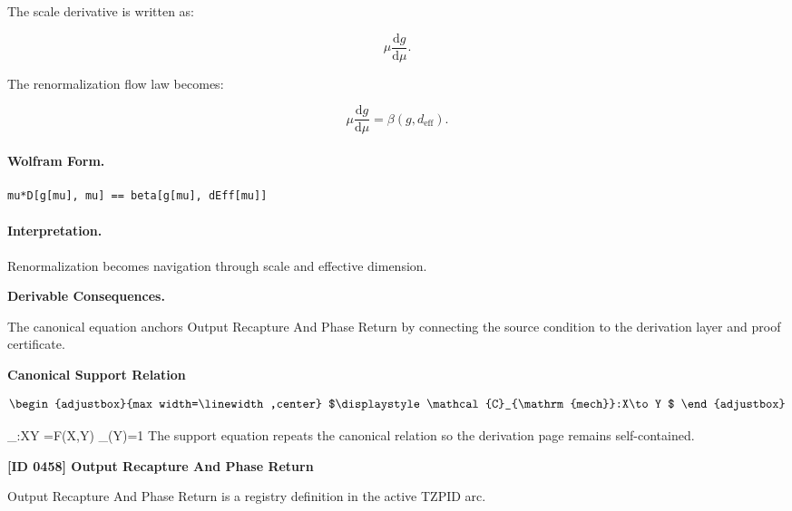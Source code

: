 The scale derivative is written as:

\begin{equation}
\mu\frac{\mathrm{d}g}{\mathrm{d}\mu}.
\end{equation}

The renormalization flow law becomes:

\begin{equation}
\boxed{
\mu\frac{\mathrm{d}g}{\mathrm{d}\mu}
=
\beta(g,d_{\mathrm{eff}}).
}
\end{equation}

\paragraph{Wolfram Form.}
\begin{verbatim}
mu*D[g[mu], mu] == beta[g[mu], dEff[mu]]
\end{verbatim}

\paragraph{Interpretation.}
Renormalization becomes navigation through scale and effective dimension.
\endgroup

\par\vspace{0.35em}
\noindent\textbf{Derivable Consequences.}\quad
\begingroup
\footnotesize
\raggedright
The canonical equation anchors Output Recapture And Phase Return by connecting the source condition to the derivation layer and proof certificate.
\par\endgroup

\noindent\textbf{Canonical Support Relation}\par
\[
\begin{adjustbox}{max width=\linewidth,center}
$\displaystyle
\mathcal{C}_{\mathrm{mech}}:X\to Y
$
\end{adjustbox}
\]

\tzpequationlinks
  {_{}:X\to Y}
  {=F(X,Y)}
  {_{}(Y)=1}
\noindent The support equation repeats the canonical relation so the derivation page remains self-contained.\par

\clearpage
\noindent\textbf{[ID 0458] Output Recapture And Phase Return}\par
\vspace{0.35em}
\begingroup\small
{}
Output Recapture And Phase Return is a registry definition in the active TZPID arc.

